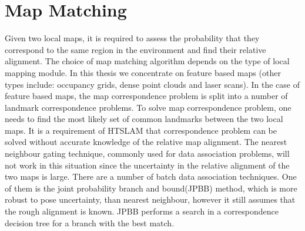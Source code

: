 \section{Map Matching}
\label{sec:map_matching}


Given two local maps, it is required to assess the probability that
they correspond to the same region in the environment and find their
relative alignment. The choice of map matching algorithm depends on
the type of local mapping module. In this thesis we concentrate on
feature based maps (other types include: occupancy grids, dense point
clouds and laser scans). In the case of feature based maps, the map
correspondence problem is split into a number of landmark
correspondence problems. To solve map correspondence problem, one
needs to find the most likely set of common landmarks between the two
local maps. It is a requirement of HTSLAM that correspondence problem
can be solved without accurate knowledge of the relative map
alignment. The nearest neighbour gating technique, commonly used for
data association problems, will not work in this situation since the
uncertainty in the relative alignment of the two maps is large. There
are a number of batch data association techniques. One of them is the
joint probability branch and bound(JPBB)
\cite{neira01:_data_assoc_stoch_mappin_using} method, which is more
robust to pose uncertainty, than nearest neighbour, however it still
assumes that the rough alignment is known. JPBB performs a search in a
correspondence decision tree for a branch with the best match.

